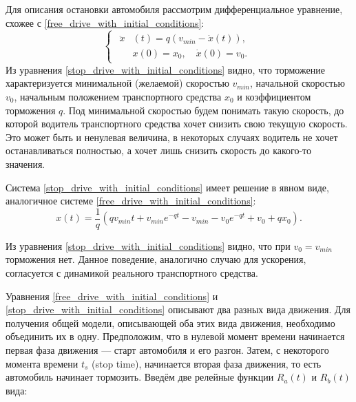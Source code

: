 \documentclass[12pt, a4paper]{extarticle}
\numberwithin{equation}{section}
\numberwithin{figure}{section}
\begin{document}
Для описания остановки автомобиля рассмотрим дифференциальное уравнение, схожее с \eqref{free_drive_with_initial_conditions}: 
\begin{equation} \label{stop_drive_with_initial_conditions}
\begin{cases}
\begin{split}
\ddot{x}&(t) = q\left( v_{min} - \dot{x}(t)\right), \\
&x(0)=x_0, \quad \dot{x}(0)=v_0.
\end{split}
\end{cases}
\end{equation}
Из уравнения \eqref{stop_drive_with_initial_conditions} видно, что торможение характеризуется минимальной (желаемой) скоростью $v_{min}$, начальной скоростью $v_{0}$, начальным положением транспортного средства $x_0$ и коэффициентом торможения $q$. Под минимальной скоростью будем понимать такую скорость, до которой водитель транспортного средства хочет снизить свою текущую скорость. Это может быть и ненулевая величина, в некоторых случаях водитель не хочет останавливаться полностью, а хочет лишь снизить скорость до какого-то значения.

Система \eqref{stop_drive_with_initial_conditions} имеет решение в явном виде, аналогичное системе \eqref{free_drive_with_initial_conditions}:
\begin{equation*}
x(t) = \dfrac{1}{q}\left(qv_{min}t+v_{min}e^{-qt}-v_{min}-v_0e^{-qt}+v_0+qx_0\right).
\end{equation*}

Из уравнения \eqref{stop_drive_with_initial_conditions} видно, что при $v_0=v_{min}$ торможения нет. Данное поведение, аналогично случаю для ускорения, согласуется с динамикой реального транспортного средства.

Уравнения \eqref{free_drive_with_initial_conditions} и  \eqref{stop_drive_with_initial_conditions} описывают два разных вида движения. Для получения общей модели, описывающей оба этих вида движения, необходимо объединить их в одну. Предположим, что в нулевой момент времени начинается первая фаза движения --- старт автомобиля и его разгон. Затем, с некоторого момента времени $t_s$ (stop time), начинается вторая фаза движения, то есть автомобиль начинает тормозить. Введём две релейные функции $R_{a}(t)$ и $R_{b}(t)$ вида:  
\end{document}
